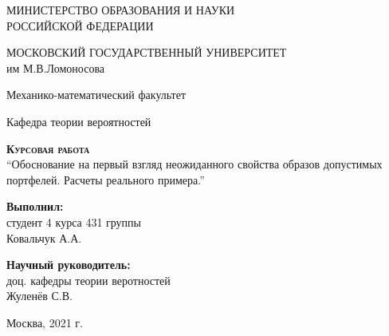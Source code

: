 \documentclass[12pt,a4 paper]{book}
\begin{document}
\begin{titlepage}
\begin{center}
\normalsize
МИНИСТЕРСТВО ОБРАЗОВАНИЯ И НАУКИ \\РОССИЙСКОЙ ФЕДЕРАЦИИ
\vspace{0.25cm}

МОСКОВСКИЙ ГОСУДАРСТВЕННЫЙ УНИВЕРСИТЕТ\\ им М.В.Ломоносова
\vspace{0.25cm}

Механико-математический факультет

Кафедра теории вероятностей
\vfill

\vfill

\textsc{\textbf{Курсовая работа}}\\[3mm]

{ “Обоснование на первый взгляд неожиданного свойства образов допустимых портфелей. Расчеты реального примера.”  }
\bigskip

\end{center}
\vfill

\newlength{\ML}
\hfill\begin{minipage}{0.4\textwidth}
\textbf{Выполнил:}\\ студент 4 курса 431 группы\\ Ковальчук А.А.

\end{minipage}%
\bigskip

\hfill\begin{minipage}{0.4\textwidth}
\textbf{Научный руководитель:}\\ доц. кафедры теории веротностей\\ Жуленёв С.В.
\end{minipage}%
\vfill

\begin{center}
\vfill

\vfill
Москва, 2021 г.
\end{center}
\end{titlepage}

\thispagestyle{empty}
\end{document}
